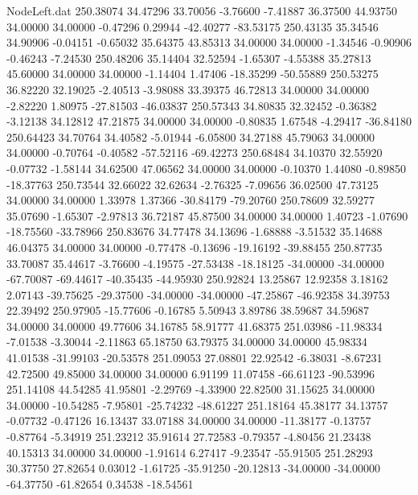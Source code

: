 \begin{filecontents}{NodeLeft.dat}
 250.38074   34.47296   33.70056    -3.76600   -7.41887   36.37500   44.93750   34.00000   34.00000   -0.47296    0.29944  -42.40277  -83.53175
 250.43135   35.34546   34.90906    -0.04151   -0.65032   35.64375   43.85313   34.00000   34.00000   -1.34546   -0.90906   -0.46243   -7.24530
 250.48206   35.14404   32.52594    -1.65307   -4.55388   35.27813   45.60000   34.00000   34.00000   -1.14404    1.47406  -18.35299  -50.55889
 250.53275   36.82220   32.19025    -2.40513   -3.98088   33.39375   46.72813   34.00000   34.00000   -2.82220    1.80975  -27.81503  -46.03837
 250.57343   34.80835   32.32452    -0.36382   -3.12138   34.12812   47.21875   34.00000   34.00000   -0.80835    1.67548   -4.29417  -36.84180
 250.64423   34.70764   34.40582    -5.01944   -6.05800   34.27188   45.79063   34.00000   34.00000   -0.70764   -0.40582  -57.52116  -69.42273
 250.68484   34.10370   32.55920    -0.07732   -1.58144   34.62500   47.06562   34.00000   34.00000   -0.10370    1.44080   -0.89850  -18.37763
 250.73544   32.66022   32.62634    -2.76325   -7.09656   36.02500   47.73125   34.00000   34.00000    1.33978    1.37366  -30.84179  -79.20760
 250.78609   32.59277   35.07690    -1.65307   -2.97813   36.72187   45.87500   34.00000   34.00000    1.40723   -1.07690  -18.75560  -33.78966
 250.83676   34.77478   34.13696    -1.68888   -3.51532   35.14688   46.04375   34.00000   34.00000   -0.77478   -0.13696  -19.16192  -39.88455
 250.87735   33.70087   35.44617    -3.76600   -4.19575  -27.53438  -18.18125  -34.00000  -34.00000  -67.70087  -69.44617  -40.35435  -44.95930
 250.92824   13.25867   12.92358     3.18162    2.07143  -39.75625  -29.37500  -34.00000  -34.00000  -47.25867  -46.92358   34.39753   22.39492
 250.97905  -15.77606   -0.16785     5.50943    3.89786   38.59687   34.59687   34.00000   34.00000   49.77606   34.16785   58.91777   41.68375
 251.03986  -11.98334   -7.01538    -3.30044   -2.11863   65.18750   63.79375   34.00000   34.00000   45.98334   41.01538  -31.99103  -20.53578
 251.09053   27.08801   22.92542    -6.38031   -8.67231   42.72500   49.85000   34.00000   34.00000    6.91199   11.07458  -66.61123  -90.53996
 251.14108   44.54285   41.95801    -2.29769   -4.33900   22.82500   31.15625   34.00000   34.00000  -10.54285   -7.95801  -25.74232  -48.61227
 251.18164   45.38177   34.13757    -0.07732   -0.47126   16.13437   33.07188   34.00000   34.00000  -11.38177   -0.13757   -0.87764   -5.34919
 251.23212   35.91614   27.72583    -0.79357   -4.80456   21.23438   40.15313   34.00000   34.00000   -1.91614    6.27417   -9.23547  -55.91505
 251.28293   30.37750   27.82654     0.03012   -1.61725  -35.91250  -20.12813  -34.00000  -34.00000  -64.37750  -61.82654    0.34538  -18.54561

\end{filecontents}

